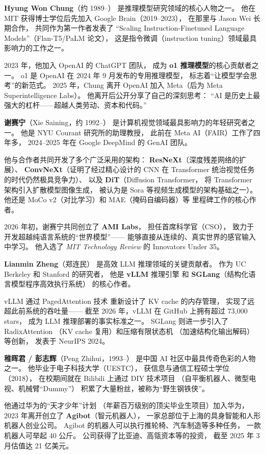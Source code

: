 \textbf{Hyung Won Chung}（约 1989--）
是推理模型研究领域的核心人物之一。
他在 MIT 获得博士学位后先加入 Google Brain（2019--2023），
在那里与 Jason Wei 长期合作，
共同作为第一作者发表了
``Scaling Instruction-Finetuned Language Models''（Flan-T5/PaLM 论文），
这是指令微调（instruction tuning）领域最具影响力的工作之一。

2023 年，他加入 OpenAI 的 ChatGPT 团队，
成为 \textbf{o1 推理模型}的核心贡献者之一。
o1 是 OpenAI 在 2024 年 9 月发布的专用推理模型，
标志着``让模型学会思考''的新范式。
2025 年，Chung 离开 OpenAI 加入 Meta（后为 Meta Superintelligence Labs）。
他离开后公开分享了自己的深刻思考：
``AI 是历史上最强大的杠杆——超越人类劳动、资本和代码。''

\textbf{谢赛宁}（Xie Saining，约 1992--）
是计算机视觉领域最具影响力的年轻研究者之一。
他是 NYU Courant 研究所的助理教授，
此前在 Meta AI（FAIR）工作了四年多，
2024--2025 年在 Google DeepMind 的 GenAI 团队。

他与合作者共同开发了多个广泛采用的架构：
\textbf{ResNeXt}（深度残差网络的扩展）、
\textbf{ConvNeXt}（证明了经过精心设计的 CNN
在 Transformer 统治视觉任务的时代仍然极具竞争力）、
以及 \textbf{DiT}（Diffusion Transformer，
将 Transformer 架构引入扩散模型图像生成，
被认为是 Sora 等视频生成模型的架构基础之一）。
他还是 MoCo v2（对比学习）和 MAE（掩码自编码器）等
里程碑工作的核心作者。

2026 年初，谢赛宁共同创立了 \textbf{AMI Labs}，
担任首席科学官（CSO），
致力于开发超越纯语言系统的``世界模型''——
能够直接从连续的、真实世界的感官输入中学习。
他入选了 \emph{MIT Technology Review} 的 Innovators Under 35。

\textbf{Lianmin Zheng}（郑连民）
是高效 LLM 推理领域的关键贡献者。
作为 UC Berkeley 和 Stanford 的研究者，
他是 \textbf{vLLM} 推理引擎
和 \textbf{SGLang}（结构化语言模型程序高效执行系统）
的核心作者。

vLLM 通过 PagedAttention 技术
重新设计了 KV cache 的内存管理，
实现了远超此前系统的吞吐量——
截至 2026 年，vLLM 在 GitHub 上拥有超过 73,000 stars，
成为 LLM 推理部署的事实标准之一。
SGLang 则进一步引入了 RadixAttention
（KV cache 复用）和压缩有限状态机
（加速结构化输出解码）等创新，
发表于 NeurIPS 2024。

\textbf{稚晖君 / 彭志辉}（Peng Zhihui，1993--）
是中国 AI 社区中最具传奇色彩的人物之一。
他毕业于电子科技大学（UESTC），
获信息与通信工程硕士学位（2018），
在校期间就在 Bilibili 上通过 DIY 技术项目
（自平衡机器人、微型电视、机械臂``Dummy''）
积累了大量粉丝，被称为``野生钢铁侠''。

他通过华为的``天才少年''计划
（年薪百万级别的顶尖毕业生项目）加入华为，
2023 年离开创立了 \textbf{Agibot}（智元机器人），
一家总部位于上海的具身智能和人形机器人创业公司。
Agibot 的机器人可以执行推轮椅、汽车制造等多种任务，
一款机器人可举起 40 公斤。
公司获得了比亚迪、高瓴资本等的投资，
截至 2025 年 3 月估值达 21 亿美元。

